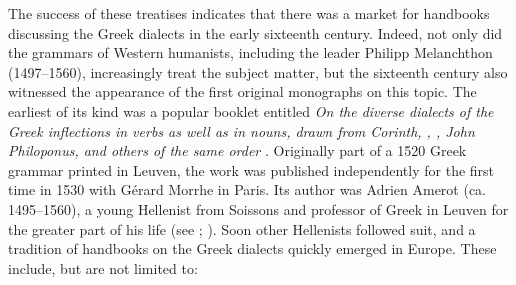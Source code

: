 The success of these treatises indicates that there was a market for handbooks discussing the Greek dialects in the early sixteenth century. Indeed, not only did the grammars of Western humanists, including the  leader Philipp Melanchthon (1497–1560), increasingly treat the subject matter, but the sixteenth century also witnessed the appearance of the first original monographs on this topic. The earliest of its kind was a popular booklet entitled \textit{On the diverse dialects of the Greek inflections in verbs as well as in nouns, drawn from Corinth, , , John Philoponus, and others of the same order} \citep{Amerot1530}. Originally part of a 1520 Greek grammar printed in Leuven, the work was published independently for the first time in 1530 with Gérard Morrhe in Paris. Its author was Adrien Amerot (ca. 1495–1560), a young Hellenist from Soissons and professor of Greek in Leuven for the greater part of his life (see \citealt{Hummel1999}; \citealt{VanRooyFcb}). Soon other Hellenists followed suit, and a tradition of  handbooks on the Greek dialects quickly emerged in Europe. These include, but are not limited to:

